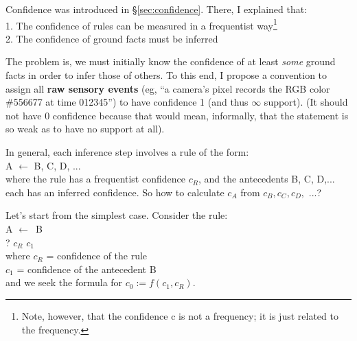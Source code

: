 Confidence was introduced in \S\ref{sec:confidence}.  There, I explained that:\\
1. The confidence of rules can be measured in a frequentist way\footnote{Note, however, that the confidence c is not a frequency; it is just related to the frequency. }\\
2. The confidence of ground facts must be inferred

The problem is, we must initially know the confidence of at least \textit{some} ground facts in order to infer those of others.  To this end, I propose a convention to assign all \textbf{raw sensory events} (eg, ``a camera's pixel records the RGB color \#556677 at time 012345'')  to have confidence 1 (and thus $\infty$ support).  (It should not have 0 confidence because that would mean, informally, that the statement is so weak as to have no support at all).

In general, each inference step involves a rule of the form:\\
\hspace*{1cm} A $\longleftarrow$ B, C, D, ...\\
where the rule has a frequentist confidence $c_R$, and the antecedents B, C, D,... each has an inferred confidence.  So how to calculate $c_A$ from $c_B, c_C, c_D,$ ...?

Let's start from the simplest case.  Consider the rule:\\
\hspace*{1cm} A $\leftarrow$\textemdash\textemdash\textemdash\textemdash\textemdash $\,$ B\\
\hspace*{1cm} ? \hspace*{0.8cm} $c_R$ \hspace*{0.7cm} $c_1$ \\
where \hspace*{0.4cm} $c_R$ = confidence of the rule\\
\hspace*{1.6cm} $c_1$ = confidence of the antecedent B\\
and we seek the formula for $c_0 := f(c_1, c_R)$.

